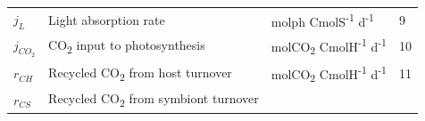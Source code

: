 \documentclass[]{elsarticle} %
\begin{document}
\begin{longtable}[c]{@{}llll@{}}
\begin{minipage}[t]{0.12\columnwidth}\raggedright\strut
\(j_L\)
\strut\end{minipage} &
\begin{minipage}[t]{0.48\columnwidth}\raggedright\strut
Light absorption rate
\strut\end{minipage} &
\begin{minipage}[t]{0.26\columnwidth}\raggedright\strut
molph CmolS\textsuperscript{-1} d\textsuperscript{-1}
\strut\end{minipage} &
\begin{minipage}[t]{0.10\columnwidth}\raggedright\strut
9
\strut\end{minipage}\tabularnewline
\begin{minipage}[t]{0.12\columnwidth}\raggedright\strut
\(j_{CO_2}\)
\strut\end{minipage} &
\begin{minipage}[t]{0.48\columnwidth}\raggedright\strut
CO\textsubscript{2} input to photosynthesis
\strut\end{minipage} &
\begin{minipage}[t]{0.26\columnwidth}\raggedright\strut
molCO\textsubscript{2} CmolH\textsuperscript{-1} d\textsuperscript{-1}
\strut\end{minipage} &
\begin{minipage}[t]{0.10\columnwidth}\raggedright\strut
10
\strut\end{minipage}\tabularnewline
\begin{minipage}[t]{0.12\columnwidth}\raggedright\strut
\(r_{CH}\)
\strut\end{minipage} &
\begin{minipage}[t]{0.48\columnwidth}\raggedright\strut
Recycled CO\textsubscript{2} from host turnover
\strut\end{minipage} &
\begin{minipage}[t]{0.26\columnwidth}\raggedright\strut
molCO\textsubscript{2} CmolH\textsuperscript{-1} d\textsuperscript{-1}
\strut\end{minipage} &
\begin{minipage}[t]{0.10\columnwidth}\raggedright\strut
11
\strut\end{minipage}\tabularnewline
\begin{minipage}[t]{0.12\columnwidth}\raggedright\strut
\(r_{CS}\)
\strut\end{minipage} &
\begin{minipage}[t]{0.48\columnwidth}\raggedright\strut
Recycled CO\textsubscript{2} from symbiont turnover

\end{minipage}
\end{longtable}
\end{document}
